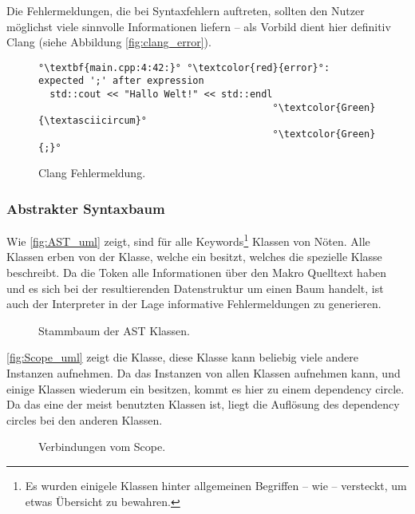       Die Fehlermeldungen, die bei Syntaxfehlern auftreten, sollten den Nutzer möglichst viele sinnvolle Informationen liefern -- als Vorbild dient hier definitiv Clang (siehe Abbildung \autoref{fig:clang_error}).

      \begin{figure}[H]
        \begin{lstlisting}[escapechar=°,numbers=none]
°\textbf{main.cpp:4:42:}° °\textcolor{red}{error}°: expected ';' after expression
  std::cout << "Hallo Welt!" << std::endl
                                         °\textcolor{Green}{\textasciicircum}°
                                         °\textcolor{Green}{;}°
        \end{lstlisting}
        \caption{Clang Fehlermeldung.}
        \label{fig:clang_error}
      \end{figure}

    \subsubsection{Abstrakter Syntaxbaum}
    \label{sssec:Abstrakter Syntaxbaum}
      Wie \autoref{fig:AST_uml} zeigt, sind für alle Keywords\footnote{
        Es wurden einigele Klassen hinter allgemeinen Begriffen -- wie  -- versteckt, um etwas Übersicht zu bewahren.
      } Klassen von Nöten. Alle Klassen erben von der  Klasse, welche ein  besitzt, welches die spezielle Klasse beschreibt. Da die Token alle Informationen  über den Makro Quelltext haben und es sich bei der resultierenden Datenstruktur um einen Baum handelt, ist auch der Interpreter in der Lage informative Fehlermeldungen zu generieren.
      \begin{figure}[H]
        \centering
        \caption{Stammbaum der AST Klassen.}
        \label{fig:AST_uml}
      \end{figure}

      \autoref{fig:Scope_uml} zeigt die  Klasse, diese Klasse kann beliebig viele andere  Instanzen aufnehmen.  Da das  Instanzen von allen  Klassen aufnehmen kann, und einige Klassen wiederum ein  besitzen, kommt es hier zu einem dependency circle. Da das  eine der meist benutzten Klassen ist, liegt die Auflösung des dependency circles bei den anderen Klassen.
      \begin{figure}[H]
        \centering
        \caption{Verbindungen vom Scope.}
        \label{fig:Scope_uml}
      \end{figure}

